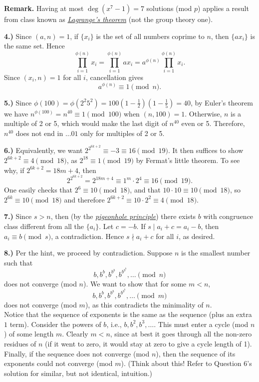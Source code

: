 \documentclass[10pt]{amsart}
\begin{document}
\smallskip

\textbf{Remark.} Having at most $\deg (x^7 - 1) = 7$ solutions (mod $p$) applies a result from class known as \href{http://en.wikipedia.org/wiki/Lagrange's_theorem_(number_theory)}{\emph{Lagrange's theorem}} (not the group theory one).

\medskip

{\bf 4.)} Since $(a, n) = 1$, if $\{x_i\}$ is the set of all numbers coprime to $n$, then $\{ax_i\}$ is the same set. Hence
\[
\prod_{i=1}^{\phi(n)} x_i = \prod_{i=1}^{\phi(n)} ax_i = a^{\phi(n)} \prod_{i=1}^{\phi(n)} x_i.
\]
Since $(x_i, n) = 1$ for all $i$, cancellation gives 
\[
a^{\phi(n)} \equiv 1 \pmod{n}.
\]

\medskip

{\bf 5.)} Since $\phi(100) = \phi(2^2 5^2) = 100(1 - \frac{1}{2})(1 - \frac{1}{5}) = 40$, by Euler's theorem we have $n^{\phi(100)} = n^{40} \equiv 1 \pmod{100}$ when $(n, 100) = 1$. Otherwise, $n$ is a multiple of 2 or 5, which would make the last digit of $n^{40}$ even or 5. Therefore, $n^{40}$ does not end in $...01$ only for multiples of 2 or 5.

\medskip

{\bf 6.)} Equivalently, we want $2^{2^{6k+2}} \equiv -3 \equiv 16 \pmod{19}$. It then suffices to show $2^{6k+2} \equiv 4 \pmod{18}$, as $2^{18} \equiv 1 \pmod{19}$ by Fermat's little theorem. To see why, if $2^{6k+2} = 18m + 4$, then
\[
2^{2^{6k+2}} = 2^{18m + 4} \equiv 1^m\cdot2^4 \equiv 16 \pmod{19}.
\]
One easily checks that $2^6 \equiv 10 \pmod{18}$, and that $10 \cdot 10 \equiv 10 \pmod{18}$, so $2^{6k} \equiv 10 \pmod{18}$ and therefore $2^{6k+2} \equiv 10\cdot 2^2 \equiv 4 \pmod{18}$.

\medskip

{\bf 7.)} Since $s > n$, then (by the \href{http://en.wikipedia.org/wiki/Pigeonhole_principle}{\emph{pigeonhole principle}}) there exists $b$ with congruence class different from all the $\{a_i\}$. Let $c = -b$. If $s \mid a_i + c = a_i - b$, then $a_i \equiv b \pmod{s}$, a contradiction. Hence $s \nmid a_i + c$ for all $i$, as desired.

\medskip

{\bf 8.)} Per the hint, we proceed by contradiction. Suppose $n$ is the smallest number such that
\[
b, b^b, b^{b^b}, b^{b^{b^b}}, \dotsc \pmod{n}
\]
does not converge (mod $n$). We want to show that for some $m < n$,
\[
b, b^b, b^{b^b}, b^{b^{b^b}}, \dotsc \pmod{m}
\]
does not converge (mod $m$), as this contradicts the minimality of $n$.\\
\indent Notice that the sequence of exponents is the same as the sequence (plus an extra $1$ term). Consider the powers of $b$, i.e., $b, b^2, b^3, \dotsc$. This must enter a cycle (mod $n$) of some length $m$. Clearly $m < n$, since at best it goes through all the non-zero residues of $n$ (if it went to zero, it would stay at zero to give a cycle length of 1). Finally, if the sequence does not converge (mod $n$), then the sequence of its exponents could not converge (mod $m$). (Think about this! Refer to Question 6's solution for similar, but not identical, intuition.)
\end{document}
